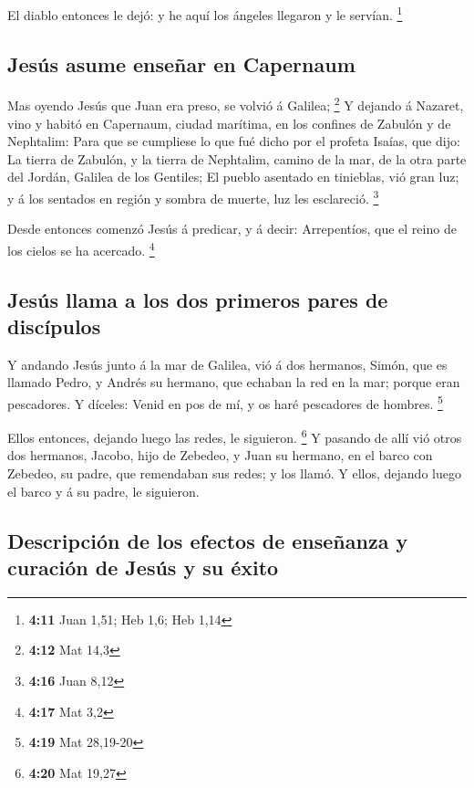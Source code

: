  El diablo entonces le dejó: y he aquí los ángeles
llegaron y le servían. \footnote{\textbf{4:11} Juan 1,51; Heb 1,6; Heb
  1,14}

\hypertarget{jesuxfas-asume-enseuxf1ar-en-capernaum}{%
\subsection{Jesús asume enseñar en
Capernaum}\label{jesuxfas-asume-enseuxf1ar-en-capernaum}}

 Mas oyendo Jesús que Juan era preso, se volvió á
Galilea; \footnote{\textbf{4:12} Mat 14,3}  Y dejando á
Nazaret, vino y habitó en Capernaum, ciudad marítima, en los confines de
Zabulón y de Nephtalim:  Para que se cumpliese lo que fué
dicho por el profeta Isaías, que dijo:  La tierra de
Zabulón, y la tierra de Nephtalim, camino de la mar, de la otra parte
del Jordán, Galilea de los Gentiles;  El pueblo asentado
en tinieblas, vió gran luz; y á los sentados en región y sombra de
muerte, luz les esclareció. \footnote{\textbf{4:16} Juan 8,12}

 Desde entonces comenzó Jesús á predicar, y á decir:
Arrepentíos, que el reino de los cielos se ha acercado. \footnote{\textbf{4:17}
  Mat 3,2}

\hypertarget{jesuxfas-llama-a-los-dos-primeros-pares-de-discuxedpulos}{%
\subsection{Jesús llama a los dos primeros pares de
discípulos}\label{jesuxfas-llama-a-los-dos-primeros-pares-de-discuxedpulos}}

 Y andando Jesús junto á la mar de Galilea, vió á dos
hermanos, Simón, que es llamado Pedro, y Andrés su hermano, que echaban
la red en la mar; porque eran pescadores.  Y díceles:
Venid en pos de mí, y os haré pescadores de hombres. \footnote{\textbf{4:19}
  Mat 28,19-20}

 Ellos entonces, dejando luego las redes, le siguieron.
\footnote{\textbf{4:20} Mat 19,27}  Y pasando de allí vió
otros dos hermanos, Jacobo, hijo de Zebedeo, y Juan su hermano, en el
barco con Zebedeo, su padre, que remendaban sus redes; y los llamó.
 Y ellos, dejando luego el barco y á su padre, le
siguieron.

\hypertarget{descripciuxf3n-de-los-efectos-de-enseuxf1anza-y-curaciuxf3n-de-jesuxfas-y-su-uxe9xito}{%
\subsection{Descripción de los efectos de enseñanza y curación de Jesús
y su
éxito}\label{descripciuxf3n-de-los-efectos-de-enseuxf1anza-y-curaciuxf3n-de-jesuxfas-y-su-uxe9xito}}

